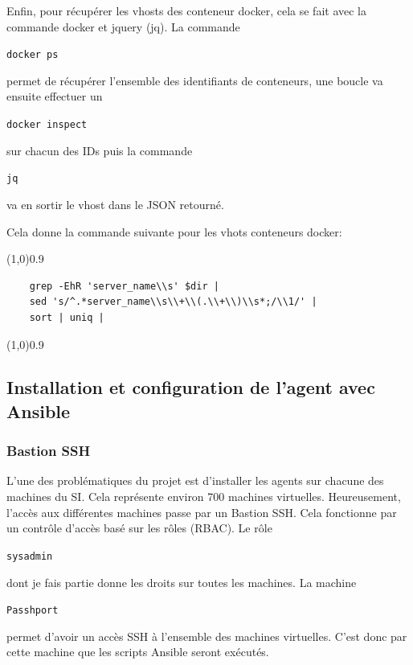 \documentclass[12pt, a4paper, twoside]{article}
\begin{document}
Enfin, pour récupérer les vhosts des conteneur docker, cela se fait avec la commande docker et jquery (jq).
La commande \begin{code}\texttt{docker ps}\end{code} permet de récupérer l'ensemble des identifiants de conteneurs, une boucle va ensuite effectuer un \begin{code} \texttt{docker inspect}\end{code} sur chacun des IDs puis la commande \begin{code} \texttt{jq}\end{code}  va en sortir le vhost dans le JSON retourné.

Cela donne la commande suivante pour les vhots conteneurs docker:
\vspace{-1ex}
\begin{code}
\vspace{-1ex}
\begin{center} 
    \line(1,0){0.9\textwidth} 
\end{center}
\vspace{-1ex}
\begin{verbatim}
    grep -EhR 'server_name\\s' $dir | 
    sed 's/^.*server_name\\s\\+\\(.\\+\\)\\s*;/\\1/' |
    sort | uniq |
\end{verbatim}
\vspace{-1ex}
\begin{center} 
    \line(1,0){0.9\textwidth} 
\end{center}
\end{code}

\subsection{Installation et configuration de l'agent avec Ansible}
\subsubsection{Bastion SSH}
L'une des problématiques du projet est d'installer les agents sur chacune des machines du \gls{SI}. 
Cela représente environ 700 machines virtuelles. 
Heureusement, l'accès aux différentes machines passe par un Bastion SSH. 
Cela fonctionne par un contrôle d'accès basé sur les rôles (\gls{RBAC}). 
Le rôle \begin{code}\texttt{sysadmin}\end{code} dont je fais partie donne les droits sur toutes les machines. 
La machine \begin{code}\texttt{Passhport}\end{code} permet d'avoir un accès SSH à l'ensemble des machines virtuelles.
C'est donc par cette machine que les scripts \gls{Ansible} seront exécutés.
\end{document}
